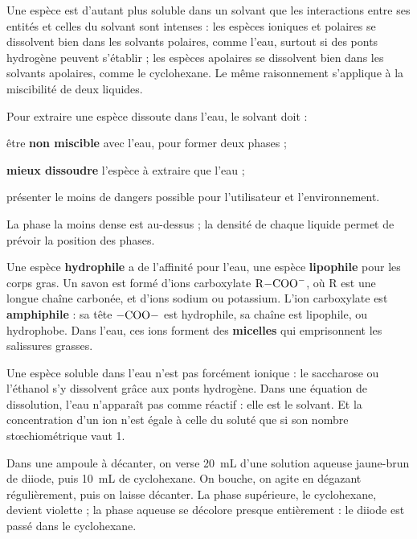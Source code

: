 \begin{propriete}
Une espèce est d'autant plus soluble dans un solvant que les interactions entre ses entités et celles du solvant sont
intenses : les espèces ioniques et polaires se dissolvent bien dans les solvants polaires, comme l'eau, surtout si des
ponts hydrogène peuvent s'établir ; les espèces apolaires se dissolvent bien dans les solvants apolaires, comme le
cyclohexane. Le même raisonnement s'applique à la miscibilité de deux liquides.
\end{propriete}
\begin{savoirfaire}
Pour extraire une espèce dissoute dans l'eau, le solvant doit :
\begin{questions}
\item être \textbf{non miscible} avec l'eau, pour former deux phases ;
\item \textbf{mieux dissoudre} l'espèce à extraire que l'eau ;
\item présenter le moins de dangers possible pour l'utilisateur et l'environnement.
\end{questions}
La phase la moins dense est au-dessus ; la densité de chaque liquide permet de prévoir la position des phases.
\end{savoirfaire}
\begin{definition}
Une espèce \textbf{hydrophile} a de l'affinité pour l'eau, une espèce \textbf{lipophile} pour les corps gras. Un savon est
formé d'ions carboxylate $\ce{R-COO-}$, où R est une longue chaîne carbonée, et d'ions sodium ou potassium. L'ion carboxylate est
\textbf{amphiphile} : sa tête $\ce{-COO-}$ est hydrophile, sa chaîne est lipophile, ou hydrophobe. Dans l'eau, ces ions forment des
\textbf{micelles} qui emprisonnent les salissures grasses.
\end{definition}
\begin{attention}
Une espèce soluble dans l'eau n'est pas forcément ionique : le saccharose ou l'éthanol s'y dissolvent grâce aux ponts
hydrogène. Dans une équation de dissolution, l'eau n'apparaît pas comme réactif : elle est le solvant. Et la concentration
d'un ion n'est égale à celle du soluté que si son nombre stœchiométrique vaut 1.
\end{attention}
\begin{experience}
Dans une ampoule à décanter, on verse \qty{20}{mL} d'une solution aqueuse jaune-brun de diiode, puis \qty{10}{mL} de cyclohexane.
On bouche, on agite en dégazant régulièrement, puis on laisse décanter. La phase supérieure, le cyclohexane, devient
violette ; la phase aqueuse se décolore presque entièrement : le diiode est passé dans le cyclohexane.
\end{experience}
